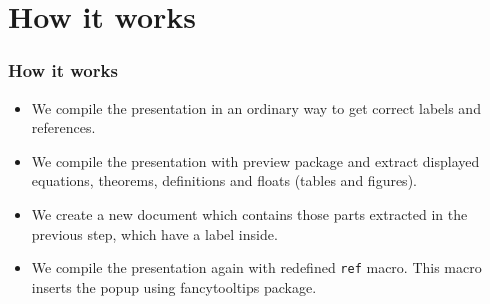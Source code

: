 \documentclass[envcountsect,t,10pt]{beamer}
\begin{document}
\section{How it works}
\begin{frame}
  \frametitle{How it works}
  \begin{itemize}
  \item We compile the presentation in an ordinary way to get correct
    labels and references.
  \item We compile the presentation with preview package and extract
    displayed equations, theorems, definitions and floats (tables and
    figures).
  \item We create a new document which contains those parts extracted
    in the previous step, which have a label inside.
  \item We compile the presentation again with redefined \texttt{ref}
    macro. This macro inserts the popup using fancytooltips package.
  \end{itemize}
\end{frame}

\end{document}
